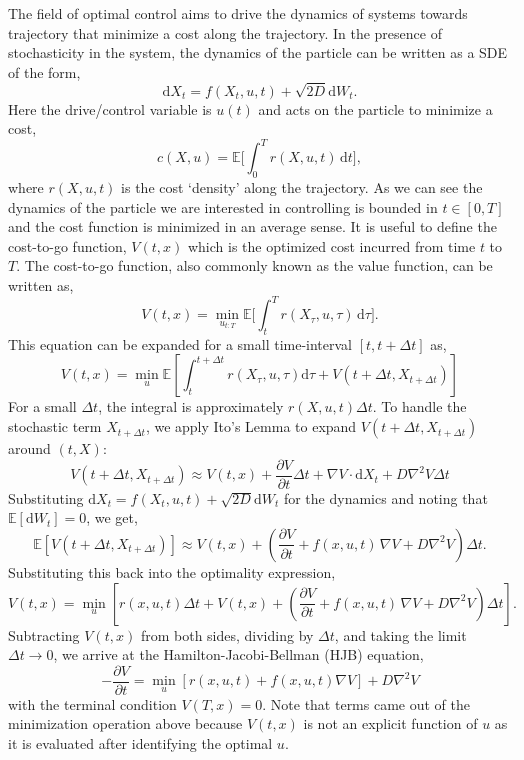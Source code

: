 \documentclass[11pt]{article}
\def\d{\mathrm{d}}
\def\E{\mathbb{E}}
\def\d{\text{d}}
\def\grad{\vec{\nabla}}
\def\grad{\nabla}
\begin{document}
\begin{singlespace}
The field of optimal control aims to drive the dynamics of systems towards trajectory that minimize a cost along the trajectory. In the presence of stochasticity in the system, the dynamics of the particle can be written as a SDE of the form,
\[
\d X_t = f(X_t, u, t) + \sqrt{2D}\d W_t.
\]
Here the drive/control variable is $u(t)$ and acts on the particle to minimize a cost,
\[
c(X, u) = \E \bigg[\int_0^T r(X, u, t)\,\d t \bigg],
\]
where $r(X, u, t)$ is the cost `density' along the trajectory. As we can see the dynamics of the particle we are interested in controlling is bounded in $t \in [0, T]$ and the cost function is minimized in an average sense. It is useful to define the cost-to-go function, $V(t, x)$ which is the optimized cost incurred from time $t$ to $T$. The cost-to-go function, also commonly known as the value function, can be written as,
\[
V(t, x) = \min_{u_{t:T}} \E \bigg[\int_t^T r(X_\tau, u, \tau)\,\d \tau \bigg].
\]
This equation can be expanded for a small time-interval $[t, t+\Delta t]$ as,
\[
V(t, x) = \min_{u} \mathbb{E} \left[ \int_t^{t+\Delta t} r(X_\tau, u, \tau) \d \tau + V(t+\Delta t, X_{t+\Delta t}) \right]
\]
For a small $\Delta t$, the integral is approximately $r(X, u, t)\Delta t$. To handle the stochastic term $X_{t+\Delta t}$, we apply Ito's Lemma to expand $V(t+\Delta t, X_{t+\Delta t})$ around $(t, X)$:
\[
V(t+\Delta t, X_{t+\Delta t}) \approx V(t, x) + \frac{\partial V}{\partial t}\Delta t + \nabla V \cdot \d X_t + D \nabla^2 V \Delta t
\]
Substituting $\d X_t = f(X_t, u, t) + \sqrt{2D}\d W_t$ for the dynamics and noting that $\E[\d W_t] = 0$, we get,
\[
\mathbb{E}[V(t+\Delta t, X_{t+\Delta t})] \approx V(t, x) + \left( \frac{\partial V}{\partial t} + f(x, u, t) \, \grad V + D \grad^2 V \right) \Delta t.
\]
Substituting this back into the optimality expression,
\[
V(t, x) = \min_{u} \left[ r(x, u, t)\Delta t + V(t, x) + \left( \frac{\partial V}{\partial t} + f(x, u, t) \, \grad V + D \grad^2 V \right) \Delta t \right].
\]
Subtracting $V(t, x)$ from both sides, dividing by $\Delta t$, and taking the limit $\Delta t \to 0$, we arrive at the Hamilton-Jacobi-Bellman (HJB) equation,
\begin{equation}
-\frac{\partial V}{\partial t} = \min_{u} \left[ r(x, u, t) + f(x, u, t) \grad V \right] + D \grad^2 V
\label{eq:HJB}
\end{equation}
with the terminal condition $V(T, x) = 0$. Note that terms came out of the minimization operation above because $V(t,x)$ is not an explicit function of $u$ as it is evaluated after identifying the optimal $u$.


\end{singlespace}
\end{document}
